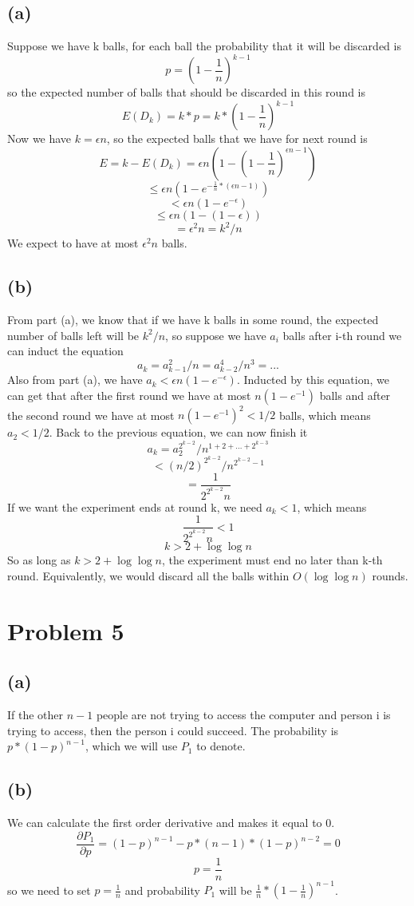 \documentclass[twoside]{homework}
\begin{document}
\subsection*{(a)}
Suppose we have k balls, for each ball the probability that it will be discarded is 
$$ p=(1-\frac{1}{n})^{k-1}$$
so the expected number of balls that should be discarded in this round is
$$ E(D_k)=k*p=k*(1-\frac{1}{n})^{k-1}$$
Now we have $k=\epsilon n$, so the expected balls that we have for next round is
$$E=k-E(D_k)=\epsilon n(1-(1-\frac{1}{n})^{\epsilon n-1})$$
$$\le \epsilon n(1-e^{-\frac{1}{n}*(\epsilon n-1)})$$
$$<\epsilon n(1-e^{-\epsilon})$$
$$\le \epsilon n(1-(1-\epsilon))$$
$$=\epsilon^2n=k^2/n$$
We expect to have at most $\epsilon^2n$ balls. 
\subsection*{(b)}
From part (a), we know that if we have k balls in some round, the expected number of balls left will be $k^2/n$, so suppose we have $a_i$ balls after i-th round we can induct the equation
$$a_k=a_{k-1}^2/n=a_{k-2}^4/n^3=...$$
Also from part (a), we have $a_k<\epsilon n(1-e^{-\epsilon})$. Inducted by this equation, we can get that after the first round we have at most $n(1-e^{-1})$ balls and after the second round we have at most $n(1-e^{-1})^2<1/2$ balls, which means $a_2<1/2$. Back to the previous equation, we can now finish it
$$a_k=a_2^{2^{k-2}}/n^{1+2+...+2^{k-3}}$$
$$<(n/2)^{2^{k-2}}/n^{2^{k-2}-1}$$
$$=\frac{1}{2^{2^{k-2}}n}$$
If we want the experiment ends at round k, we need $a_k<1$, which means
$$\frac{1}{2^{2^{k-2}}n}<1$$
$$k>2+\log \log n$$
So as long as $k>2+\log \log n$, the experiment must end no later than k-th round. Equivalently, we would discard all the balls within $O(\log \log n)$ rounds.
\section*{Problem 5}
\subsection*{(a)}
If the other $n-1$ people are not trying to access the computer and person i is trying to access, then the person i could succeed. The probability is $p*(1-p)^{n-1}$, which we will use $P_1$ to denote.
\subsection*{(b)}
We can calculate the first order derivative and makes it equal to 0.
$$\frac{\partial P_1}{\partial p}=(1-p)^{n-1}-p*(n-1)*(1-p)^{n-2}=0$$
$$p=\frac{1}{n}$$
so we need to set $p=\frac{1}{n}$ and probability $P_1$ will be $\frac{1}{n}*(1-\frac{1}{n})^{n-1}$. 
\end{document}
